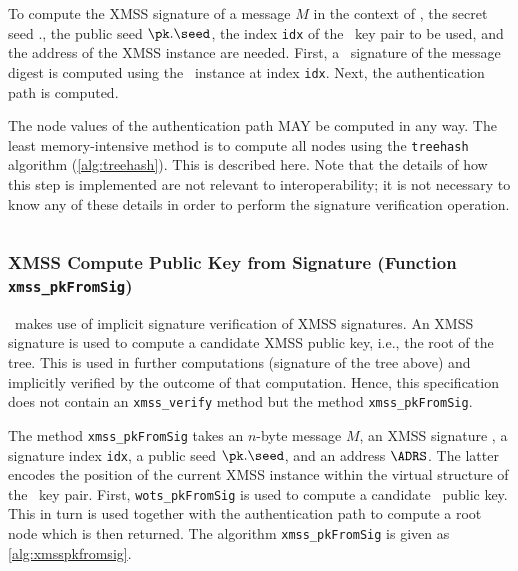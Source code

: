 To compute the XMSS signature of a message $M$ in the context of \SPHINCSA, the secret seed \sk.\seed, the public seed $\pk.\seed$, the index \texttt{idx} of the \WOTSCS\ key pair to be used, and the address \ADRS of the XMSS instance are needed. First, a \WOTSCS\ signature of the message digest is computed using the \WOTSCS\ instance at index \texttt{idx}. Next, the authentication path is computed.

The node values of the authentication path MAY be computed in any way. The least memory-intensive method is to compute all nodes using the \texttt{treehash} algorithm (\cref{alg:treehash}). This is described here. Note that the details of how this step is implemented are not relevant to interoperability; it is not necessary to know any of these details in order to perform the signature verification operation.

\begin{algorithm}
\inputminted[breaklines,linenos,tabsize=2,mathescape,escapeinside=||]{C}{paper/code/xmss_sign.cs}
\caption{\texttt{xmss\_sign} --- Generating an XMSS signature.}
\label{alg:xmsssign}
\end{algorithm}

\subsubsection{XMSS Compute Public Key from Signature (Function \texttt{xmss\_pkFromSig})}

\SPHINCSA\ makes use of implicit signature verification of XMSS signatures. An XMSS signature is used to compute a candidate XMSS public key, i.e., the root of the tree. This is used in further computations (signature of the tree above) and implicitly verified by the outcome of that computation. Hence, this specification does not contain an \texttt{xmss\_verify} method but the method \texttt{xmss\_pkFromSig}.

The method \texttt{xmss\_pkFromSig} takes an $n$-byte message $M$, an XMSS signature \sigxmss, a signature index \texttt{idx}, a public seed $\pk.\seed$, and an address $\ADRS$. The latter encodes the position of the current XMSS instance within the virtual structure of the \SPHINCSA\ key pair. First, \texttt{wots\_pkFromSig} is used to compute a candidate \WOTSCS\ public key. This in turn is used together with the authentication path to compute a root node which is then returned. The algorithm \texttt{xmss\_pkFromSig} is given as \cref{alg:xmsspkfromsig}.

\begin{algorithm}
\inputminted[breaklines,linenos,tabsize=2,mathescape,escapeinside=||]{C}{paper/code/xmss_pkFromSig.cs}
\caption{\texttt{xmss\_pkFromSig} --- Computing an XMSS public key from an XMSS signature.}
\label{alg:xmsspkfromsig}
\end{algorithm}




